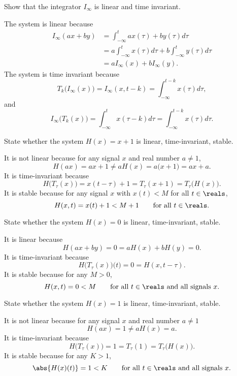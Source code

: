 \begin{excersizelist}
\item Show that the integrator $I_\infty$ is linear and time invariant.
\begin{solution}
The system is linear because
\begin{align*}
I_\infty(ax + by) &= \int_{-\infty}^t ax(\tau) + b y(\tau) d\tau \\
&= a\int_{-\infty}^t x(\tau) d\tau + b \int_{-\infty}^t y(\tau) d\tau \\
&= a I_\infty(x)  + b I_\infty(y).
\end{align*}
The system is time invariant because
\[
T_k\big(I_\infty(x)\big) = I_\infty(x,t-k) = \int_{-\infty}^{t-k} x(\tau) d\tau,
\]
and
\[
I_\infty\big(T_k(x)\big) = \int_{-\infty}^{t} x(\tau-k) d\tau = \int_{-\infty}^{t-k} x(\tau) d\tau.
\]
\end{solution}

\item State whether the system $H(x) = x + 1$ is linear, time-invariant,  stable.
\begin{solution}
It is not linear because for any signal $x$ and real number $a \neq 1$,
\[
H(ax) = ax + 1 \neq aH(x) = a\big( x + 1\big) = ax + a.
\]
It is time-invariant because
\[
H\big(T_{\tau}(x)\big) = x(t - \tau) + 1 = T_\tau(x + 1) = T_\tau\big(H(x)\big).
\]
It is  stable because for any signal $x$ with $x(t) < M$ for all $t\in\reals$, 
\[
H(x,t) = x(t) + 1 < M+1 \qquad \text{for all $t \in \reals$}. 
\]
\end{solution}

\item State whether the system $H(x) = 0$ is linear, time-invariant,  stable.
\begin{solution}
It is linear because
\[
H(ax + by) = 0 = aH(x) + bH(y) = 0.
\]
It is time-invariant because
\[
H\big(T_{\tau}(x)\big)\big(t\big) = 0 = H(x,t-\tau).
\]
It is  stable because for any $M > 0$, 
\[
H(x,t) = 0 < M \qquad \text{for all $t \in \reals$ and all signals $x$}. 
\]
\end{solution}

\item State whether the system $H(x) = 1$ is linear, time-invariant,  stable.
\begin{solution}
It is not linear because for any signal $x$ and real number $a \neq 1$
\[
H(ax) = 1 \neq  aH(x) = a.
\]
It is time-invariant because
\[
H\big(T_{\tau}(x)\big) = 1 = T_\tau(1) = T_\tau\big(H(x)\big).
\]
It is  stable because for any $K > 1$, 
\[
\abs{H(x)(t)} = 1 < K \qquad \text{for all $t \in \reals$ and all signals $x$}. 
\]
\end{solution}


\end{excersizelist}
